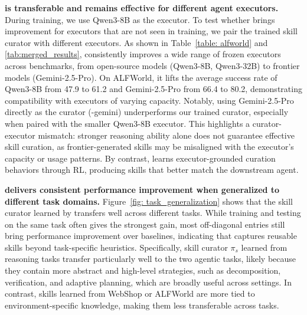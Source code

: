 \noindent\textbf{\ours{} is transferable and remains effective for different agent executors.}
During training, we use Qwen3-8B as the executor. To test whether \ours{} brings improvement for executors that are not seen in training, we pair the trained skill curator with different executors. As shown in Table~\ref{table: alfworld} and \ref{tab:merged_results}, \ours{} consistently improves a wide range of frozen executors across benchmarks, from open-source models (Qwen3-8B, Qwen3-32B) to frontier models (Gemini-2.5-Pro). On ALFWorld, it lifts the average success rate of Qwen3-8B from 47.9 to 61.2 and Gemini-2.5-Pro from 66.4 to 80.2, demonstrating compatibility with executors of varying capacity. Notably, using Gemini-2.5-Pro directly as the curator (\ours{}-gemini) underperforms our trained curator, especially when paired with the smaller Qwen3-8B executor. This highlights a curator-executor mismatch: stronger reasoning ability alone does not guarantee effective skill curation, as frontier-generated skills may be misaligned with the executor's capacity or usage patterns. By contrast, \ours{} learns executor-grounded curation behaviors through RL, producing skills that better match the downstream agent.

\noindent\textbf{\ours{} delivers consistent performance improvement when generalized to different task domains.} Figure~\ref{fig: task_generalization} shows that the skill curator learned by \ours{} transfers well across different tasks. While training and testing on the same task often gives the strongest gain, most off-diagonal entries still bring performance improvement over baselines, indicating that \ours{} captures reusable skills beyond task-specific heuristics. Specifically, skill curator $\pi_{s}$ learned from reasoning tasks transfer particularly well to the two agentic tasks, likely because they contain more abstract and high-level strategies, such as decomposition, verification, and adaptive planning, which are broadly useful across settings. In contrast, skills learned from WebShop or ALFWorld are more tied to environment-specific knowledge, making them less transferable across tasks.